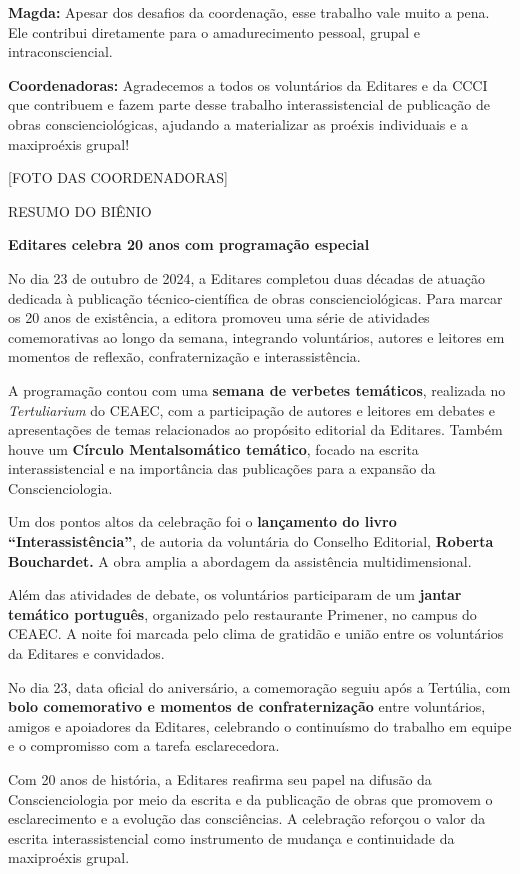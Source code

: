 \textbf{Magda:} Apesar dos desafios da coordenação, esse trabalho vale muito a pena. Ele contribui diretamente para o amadurecimento pessoal, grupal e intraconsciencial.

\textbf{Coordenadoras:} Agradecemos a todos os voluntários da Editares e da CCCI que contribuem e fazem parte desse trabalho interassistencial de publicação de obras conscienciológicas, ajudando a materializar as proéxis individuais e a maxiproéxis grupal!

{[}FOTO DAS COORDENADORAS{]}

RESUMO DO BIÊNIO

\textbf{Editares celebra 20 anos com programação especial}

No dia 23 de outubro de 2024, a Editares completou duas décadas de atuação dedicada à publicação técnico-científica de obras conscienciológicas. Para marcar os 20 anos de existência, a editora promoveu uma série de atividades comemorativas ao longo da semana, integrando voluntários, autores e leitores em momentos de reflexão, confraternização e interassistência.

A programação contou com uma \textbf{semana de verbetes temáticos}, realizada no \emph{Tertuliarium} do CEAEC, com a participação de autores e leitores em debates e apresentações de temas relacionados ao propósito editorial da Editares. Também houve um \textbf{Círculo Mentalsomático temático}, focado na escrita interassistencial e na importância das publicações para a expansão da Conscienciologia.

Um dos pontos altos da celebração foi o \textbf{lançamento do livro ``Interassistência''}, de autoria da voluntária do Conselho Editorial, \textbf{Roberta Bouchardet.} A obra amplia a abordagem da assistência multidimensional.

Além das atividades de debate, os voluntários participaram de um \textbf{jantar temático português}, organizado pelo restaurante Primener, no campus do CEAEC. A noite foi marcada pelo clima de gratidão e união entre os voluntários da Editares e convidados.

No dia 23, data oficial do aniversário, a comemoração seguiu após a Tertúlia, com \textbf{bolo comemorativo e momentos de confraternização} entre voluntários, amigos e apoiadores da Editares, celebrando o continuísmo do trabalho em equipe e o compromisso com a tarefa esclarecedora.

Com 20 anos de história, a Editares reafirma seu papel na difusão da Conscienciologia por meio da escrita e da publicação de obras que promovem o esclarecimento e a evolução das consciências. A celebração reforçou o valor da escrita interassistencial como instrumento de mudança e continuidade da maxiproéxis grupal.

